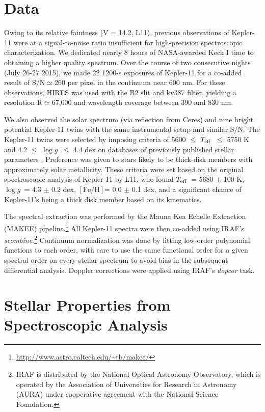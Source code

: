 \documentclass[twocolumn]{aastex61}
\newcommand{\teff}{$T_{\rm eff}$}
\newcommand{\logg}{$\log g$}
\newcommand{\feh}{$\mathrm{[Fe/H]}$}
\begin{document}
\section{Data}
\label{s:data}


Owing to its relative faintness (V = 14.2, L11), previous observations of Kepler-11 were at a signal-to-noise ratio insufficient for high-precision spectroscopic characterization. We dedicated nearly 8 hours of NASA-awarded Keck I time to obtaining a higher quality spectrum. Over the course of two consecutive nights (July 26-27 2015), we made 22 1200-s exposures of Kepler-11 for a co-added result of S/N$\simeq$260 per pixel in the continuum near 600 nm. For these observations, HIRES was used with the B2 slit and kv387 filter, yielding a resolution R$\simeq$67,000 and wavelength coverage between 390 and 830 nm.

We also observed the solar spectrum (via reflection from Ceres) and nine bright potential Kepler-11 twins with the same instrumental setup and similar S/N. The Kepler-11 twins were selected by imposing criteria of 5600 $\leq$ \teff\ $\leq$ 5750 K and 4.2 $\leq$ \logg\ $\leq$ 4.4 dex on databases of previously published stellar parameters \citep{Adibekyan2012, Bensby2014}. Preference was given to stars likely to be thick-disk members with approximately solar metallicity. These criteria were set based on the original spectroscopic analysis of Kepler-11 by L11, who found \teff\ = 5680 $\pm$ 100 K, \logg\ = 4.3 $\pm$ 0.2 dex, \feh = 0.0 $\pm$ 0.1 dex, and a significant chance of Kepler-11's being a thick disk member based on its kinematics.

The spectral extraction was performed by the Mauna Kea Echelle Extraction (MAKEE) pipeline.\footnote{\url{
http://www.astro.caltech.edu/~tb/makee/}} All Kepler-11 spectra were then co-added using IRAF's \textit{scombine}.\footnote{IRAF is distributed by the National Optical Astronomy Observatory, which is operated by the Association of Universities for Research in Astronomy (AURA) under cooperative agreement with the National Science Foundation.} Continuum normalization was done by fitting low-order polynomial functions to each order, with care to use the same functional order for a given spectral order on every stellar spectrum to avoid bias in the subsequent differential analysis. Doppler corrections were applied using IRAF's \textit{dopcor} task.



\section{Stellar Properties from Spectroscopic Analysis}
\label{s:characterization}
\end{document}
